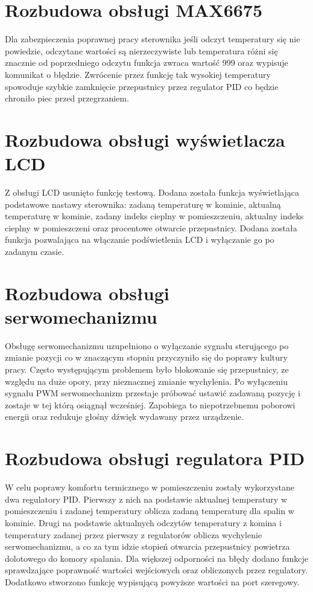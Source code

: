 \documentclass[11pt]{report}
\begin{document}
 \section{Rozbudowa obsługi MAX6675}
 Dla zabezpieczenia poprawnej pracy sterownika jeśli odczyt temperatury się nie powiedzie, odczytane wartości są nierzeczywiste lub temperatura różni się znacznie od poprzedniego odczytu funkcja zwraca wartość 999 oraz wypisuje komunikat o błędzie. Zwrócenie przez funkcję tak wysokiej temperatury spowoduje szybkie zamknięcie przepustnicy przez regulator PID co będzie chroniło piec przed przegrzaniem.
 
 \section{Rozbudowa obsługi wyświetlacza LCD}
 Z obsługi LCD usunięto funkcję testową. Dodana została funkcja wyświetlająca podstawowe nastawy sterownika: zadaną temperaturę w kominie, aktualną temperaturę w kominie, zadany indeks cieplny w pomieszczeniu, aktualny indeks cieplny w pomieszczeni oraz procentowe otwarcie przepustnicy. Dodana została funkcja pozwalająca na włączanie podświetlenia LCD i wyłączanie go po zadanym czasie.

 \section{Rozbudowa obsługi serwomechanizmu}
 Obsługę serwomechanizmu uzupełniono o wyłączanie sygnału sterującego po zmianie pozycji co w znaczącym stopniu przyczyniło się do poprawy kultury pracy. Często występującym problemem było blokowanie się przepustnicy, ze względu na duże opory, przy nieznacznej zmianie wychylenia. Po wyłączeniu sygnału PWM serwomechanizm przestaje próbować ustawić zadawaną pozycję i zostaje w tej którą osiągnął wcześniej. Zapobiega to niepotrzebnemu poborowi energii oraz redukuje głośny dźwięk wydawany przez urządzenie.

 \section{Rozbudowa obsługi regulatora PID}
 W celu poprawy komfortu termicznego w pomieszczeniu zostały wykorzystane dwa regulatory PID. Pierwszy z nich na podstawie aktualnej temperatury w pomieszczeniu i zadanej temperatury oblicza zadaną temperaturę dla spalin w kominie. Drugi na podstawie aktualnych odczytów temperatury z komina i temperatury zadanej przez pierwszy z regulatorów oblicza wychylenie serwomechanizmu, a co za tym idzie stopień otwarcia przepustnicy powietrza dolotowego do komory spalania.
 Dla większej odporności na błędy dodano funkcje sprawdzające poprawność wartości wejściowych oraz obliczonych przez regulatory. Dodatkowo stworzono funkcję wypisującą powyższe wartości na port szeregowy.
\end{document}
